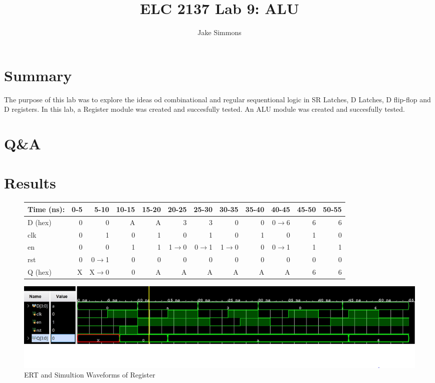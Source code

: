 \documentclass[11pt]{article}
\begin{document}
\title{ELC 2137 Lab 9: ALU}
\author{Jake Simmons}

\maketitle


\section*{Summary}

The purpose of this lab was to explore the ideas od combinational and regular sequentional logic in SR Latches, D Latches, D flip-flop and D registers. In this lab, a Register module was created and succesfully tested. An ALU module was created and succesfully tested.  


\section*{Q\&A}



\section*{Results}

\begin{figure}[ht]\centering
	\begin{tabular}{l|rrrrrrrrrrr}
		Time (ns): & 0-5 & 5-10 & 10-15 & 15-20 & 20-25 & 25-30 & 30-35 & 35-40 & 40-45 & 45-50 & 50-55 \\
		\midrule
		D (hex) & 0 & 0 & A & A & 3 & 3 & 0 & 0 & 0$\rightarrow$6 & 6 & 6 \\
		clk & 0 & 1 & 0 & 1 & 0 & 1 & 0 & 1 & 0 & 1 & 0  \\
		en & 0 & 0 & 1 & 1 & 1$\rightarrow$0 & 0$\rightarrow$1 & 1$\rightarrow$0 & 0 & 0$\rightarrow$1 & 1 & 1 \\
		rst & 0 & 0$\rightarrow$1 & 0 & 0 & 0 & 0 & 0 & 0 & 0 & 0 & 0 \\
		\midrule 
		Q (hex) & X & X$\rightarrow$0 & 0 & A & A & A & A & A & A & 6 & 6 \\
		\bottomrule
	\end{tabular}\medskip
	
	\includegraphics{register_test.JPG}
	\caption{ERT and Simultion Waveforms of Register}
	\label{fig:sim_with_table}
\end{figure}
\end{document}
